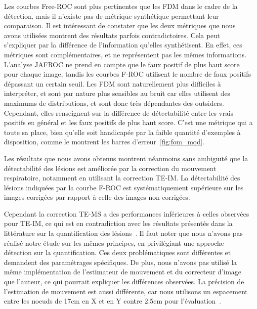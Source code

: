 Les courbes Free-ROC sont plus pertinentes que les FDM dans le cadre de la
détection, mais il n'existe pas de métrique synthétique permettant leur
comparaison. Il est intéressant de constater que les deux métriques que nous
avons utilisées montrent des résultats parfois contradictoires. Cela peut
s'expliquer par la différence de l'information qu'elles synthétisent. En effet,
ces métriques sont complémentaires, et ne représentent pas les mêmes
informations. L'analyse JAFROC
ne prend en compte que le faux positif de plus haut score pour chaque image,
tandis les courbes F-ROC utilisent le nombre de faux positifs dépassant un
certain seuil. Les FDM sont naturellement plus difficiles à interpréter, et sont
par nature plus sensibles au bruit car elles utilisent des maximums de distributions, et sont
donc très dépendantes des outsiders. Cependant, elles renseignent
sur la différence de détectabilité entre les vrais positifs en général et les
faux positifs de plus haut score. C’est une métrique qui a toute sa place, bien
qu’elle soit handicapée par la faible quantité d’exemples à disposition, comme
le montrent les barres d’erreur~\ref{fig:fom_mod}.



Les résultats que nous avons obtenus montrent néanmoins sans ambiguïté que
la détectabilité des lésions est améliorée par la correction du mouvement
respiratoire, notamment en utilisant la correction TE-IM. La détectabilité des
lésions indiquées par la courbe F-ROC est systématiquement supérieure sur les
images corrigées par rapport à celle des images non corrigées. 

Cependant la correction TE-MS a des performances inférieures à celles observées
pour TE-IM, ce qui est en contradiction avec les résultats présentés dans la
littérature sur la quantification des
lésions~\cite{lamare2007list,qiao2006motion}. Il faut noter que nous n'avons pas
réalisé notre
étude sur les mêmes principes, en privilégiant une approche détection sur la
quantification. Ces deux problématiques sont différentes et demandent des
paramétrages spécifiques. De plus, nous n'avons pas utilisé la même
implémentation de l'estimateur de mouvement et du correcteur d'image que
l'auteur, ce qui pourrait expliquer les différences observées. La précision de
l'estimation de mouvement est aussi différente, car nous utilisons un
espacement entre les noeuds de 17cm en X et en Y contre 2.5cm pour
l'évaluation~\cite{lamare2007list}.


% 
% 
% 

